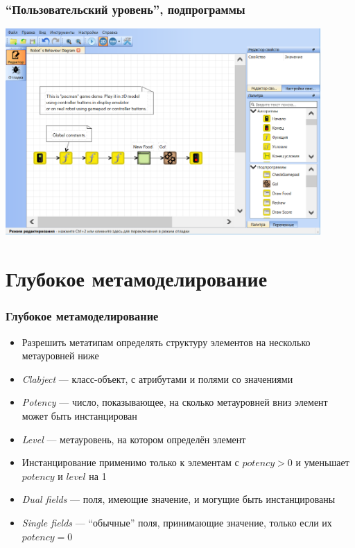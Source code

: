 \documentclass[xetex,mathserif,serif]{beamer}
\begin{document}
	\begin{frame}
		\frametitle{``Пользовательский уровень'', подпрограммы}
		\begin{center}
			\includegraphics[width=0.90\textwidth]{trikStudio.png}
		\end{center}
	\end{frame}

	\section{Глубокое метамоделирование}

	\begin{frame}
		\frametitle{Глубокое метамоделирование}
		\begin{itemize}
			\item Разрешить метатипам определять структуру элементов на несколько метауровней ниже
			\item \textit{Clabject} --- класс-объект, с атрибутами и полями со значениями
			\item \textit{Potency} --- число, показывающее, на сколько метауровней вниз элемент может быть инстанцирован
			\item \textit{Level} --- метауровень, на котором определён элемент
			\item Инстанцирование применимо только к элементам с $potency > 0$ и уменьшает $potency$ и $level$ на 1
			\item \textit{Dual fields} --- поля, имеющие значение, и могущие быть инстанцированы
			\item \textit{Single fields} --- ``обычные'' поля, принимающие значение, только если их $potency = 0$
		\end{itemize}
	\end{frame}
\end{document}
